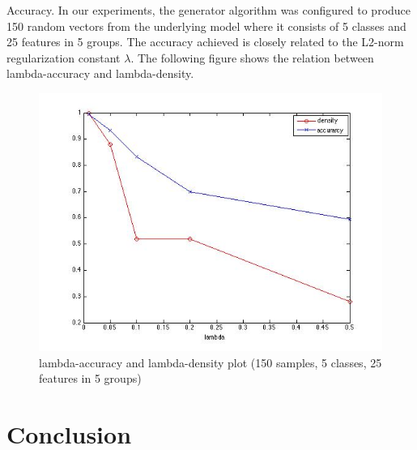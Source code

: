 \documentclass[11pt]{article}
\begin{document}
Accuracy. In our experiments, the generator algorithm was configured to produce 150 random vectors from the underlying model where it consists of 5 classes and 25 features in 5 groups. The accuracy achieved is closely related to the L2-norm regularization constant $\lambda$. The following figure shows the relation between lambda-accuracy and lambda-density.\\

\begin{figure}[ht]
\begin{center}
	\includegraphics[width=\linewidth]{m3_img}
	\caption{lambda-accuracy and lambda-density plot (150 samples, 5 classes, 25 features in 5 groups)}
\end{center}
\end{figure}




\section{Conclusion}


\end{document}
